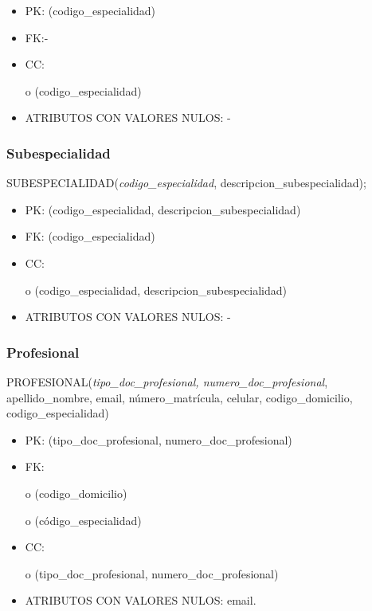 \documentclass[a4paper,11pt]{article}
\begin{document}
\begin{itemize}
\item PK: (codigo\_especialidad)

\item FK:-

\item CC:

o (codigo\_especialidad)

\item ATRIBUTOS CON VALORES NULOS: - \label{HToc293405838}
\end{itemize}

\subsubsection{\textbf{Subespecialidad}}

SUBESPECIALIDAD(\emph{codigo\_especialidad}, descripcion\_subespecialidad);

\begin{itemize}
\item PK: (codigo\_especialidad, descripcion\_subespecialidad)

\item FK: (codigo\_especialidad)

\item CC:

o (codigo\_especialidad, descripcion\_subespecialidad)

\item ATRIBUTOS CON VALORES NULOS: -\label{HToc293405839}
\end{itemize}

\subsubsection{\textbf{Profesional}}

PROFESIONAL(\emph{tipo\_doc\_profesional, numero\_doc\_profesional}, apellido\_nombre, 
email, número\_matrícula, celular,\textit{\textbf{ }}codigo\_domicilio, codigo\_especialidad)

\begin{itemize}
\item PK: (tipo\_doc\_profesional, numero\_doc\_profesional)

\item FK: 

o (codigo\_domicilio)

o (código\_especialidad)

\item CC:

o (tipo\_doc\_profesional, numero\_doc\_profesional) 

\item ATRIBUTOS CON VALORES NULOS:  email.\label{HToc293405840}
\end{itemize}
\end{document}

